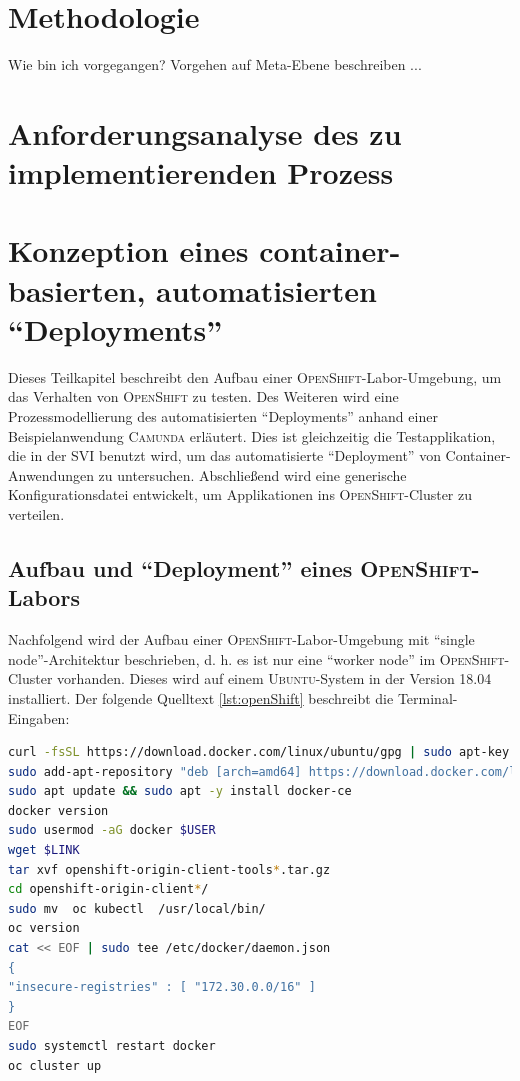 \section{Methodologie}
Wie bin ich vorgegangen? Vorgehen auf Meta-Ebene beschreiben ...

\section{Anforderungsanalyse des zu implementierenden Prozess}


\section{Konzeption eines container-basierten, automatisierten \enquote{Deployments}}
Dieses Teilkapitel beschreibt den Aufbau einer \textsc{OpenShift}-Labor-Umgebung, um das Verhalten von \textsc{OpenShift} zu testen. Des Weiteren wird eine Prozessmodellierung des automatisierten \enquote{Deployments} anhand einer Beispielanwendung \textsc{Camunda} erläutert. Dies ist gleichzeitig die Testapplikation, die in der \ac{SVI} benutzt wird, um das automatisierte \enquote{Deployment} von Container-Anwendungen zu untersuchen. Abschließend wird eine generische Konfigurationsdatei entwickelt, um Applikationen ins \textsc{OpenShift}-Cluster zu verteilen.

\subsection{Aufbau und \enquote{Deployment} eines \textsc{OpenShift}-Labors}
Nachfolgend wird der Aufbau einer \textsc{OpenShift}-Labor-Umgebung mit \enquote{single node}-Architektur beschrieben, d. h. es ist nur eine \enquote{worker node} im \textsc{OpenShift}-Cluster vorhanden. Dieses wird auf einem \textsc{Ubuntu}-System in der Version 18.04 installiert. Der folgende Quelltext \vref{lst:openShift} beschreibt die Terminal-Eingaben:

\begin{lstlisting}[language=bash, caption={Installation des \textsc{OpenShift}-Clusters}, label=lst:openShift]
curl -fsSL https://download.docker.com/linux/ubuntu/gpg | sudo apt-key add -
sudo add-apt-repository "deb [arch=amd64] https://download.docker.com/linux/ubuntu $(lsb_release -cs) stable"
sudo apt update && sudo apt -y install docker-ce
docker version
sudo usermod -aG docker $USER
wget $LINK
tar xvf openshift-origin-client-tools*.tar.gz
cd openshift-origin-client*/
sudo mv  oc kubectl  /usr/local/bin/
oc version 
cat << EOF | sudo tee /etc/docker/daemon.json 
{
"insecure-registries" : [ "172.30.0.0/16" ]
}
EOF
sudo systemctl restart docker
oc cluster up
\end{lstlisting}

